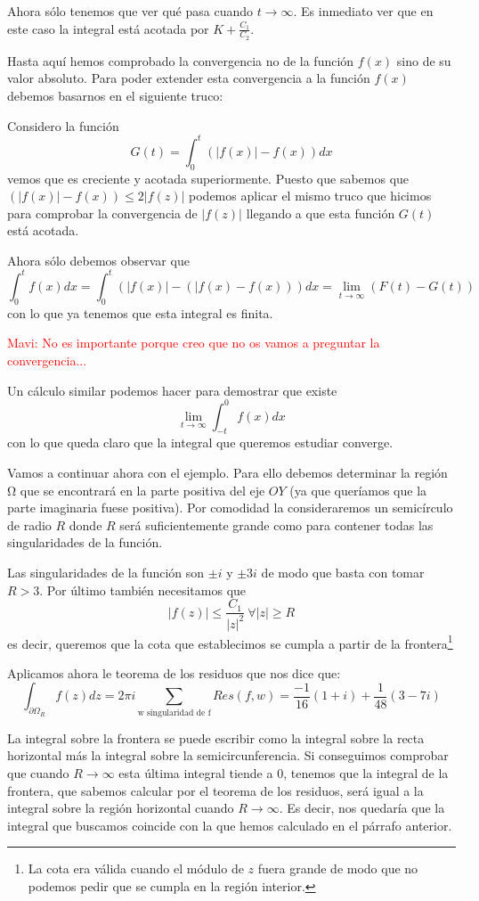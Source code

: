 \documentclass{apuntes}
\begin{document}
\begin{enumerate}
\begin{enumerate}
\begin{example}
Ahora sólo tenemos que ver qué pasa cuando $t \to \infty$. Es inmediato ver que en este caso la integral está acotada por $K+\frac{C_1}{C_2}$.

Hasta aquí hemos comprobado la convergencia no de la función $f(x)$ sino de su valor absoluto. Para poder extender esta convergencia a la función $f(x)$ debemos basarnos en el siguiente truco:

Considero la función
\[G(t)=\int_0^t \left( |f(x)|-f(x)\right)dx\]
vemos que es creciente y acotada superiormente. Puesto que sabemos que $\left( |f(x)|-f(x)\right) \leq 2|f(z)|$ podemos aplicar el mismo truco que hicimos para comprobar la convergencia de $|f(z)|$ llegando a que esta función $G(t)$ está acotada.

Ahora sólo debemos observar que
\[\int_0^tf(x)dx = \int_0^t \left( |f(x)|-(|f(x)-f(x))\right)dx = \lim_{t \to \infty} (F(t)-G(t))\]
con lo que ya tenemos que esta integral es finita.

\textcolor{red}{Mavi: No es importante porque creo que no os vamos a preguntar la convergencia...}

Un cálculo similar podemos hacer para demostrar que existe
\[\lim_{t \to \infty} \int_{-t}^0 f(x)dx\]
con lo que queda claro que la integral que queremos estudiar converge.

Vamos a continuar ahora con el ejemplo. Para ello debemos determinar la región Ω que se encontrará en la parte positiva del eje $OY$ (ya que queríamos que la parte imaginaria fuese positiva). Por comodidad la consideraremos un semicírculo de radio $R$ donde $R$ será suficientemente grande como para contener todas las singularidades de la función.

Las singularidades de la función son $\pm i$ y $\pm 3i$ de modo que basta con tomar $R>3$. Por último también necesitamos que
\[|f(z)| \leq \frac{C_1}{|z|^2} \ \forall |z| \geq R\]
es decir, queremos que la cota que establecimos se cumpla a partir de la frontera\footnote{La cota era válida cuando el módulo de $z$ fuera grande de modo que no podemos pedir que se cumpla en la región interior.}

Aplicamos ahora le teorema de los residuos que nos dice que:
\[\int_{\partial Ω_R} f(z)dz = 2πi\sum_{\text{w singularidad de f}} Res(f,w) = \frac{-1}{16}(1+i)+\frac{1}{48}(3-7i)\]

La integral sobre la frontera se puede escribir como la integral sobre la recta horizontal más la integral sobre la semicircunferencia. Si conseguimos comprobar que cuando $R\to \infty$ esta última integral tiende a 0, tenemos que la integral de la frontera, que sabemos calcular por el teorema de los residuos, será igual a la integral sobre la región horizontal cuando $R \to \infty$. Es decir, nos quedaría que la integral que buscamos coincide con la que hemos calculado en el párrafo anterior.


\end{example}
\end{enumerate}
\end{enumerate}
\end{document}
